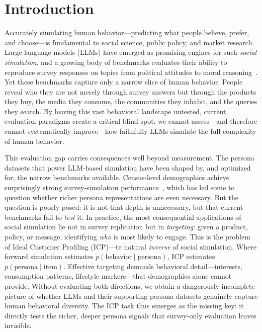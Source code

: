 \section{Introduction}
\label{sec:intro}

Accurately simulating human behavior---predicting what people believe, prefer, and choose---is fundamental to social science, public policy, and market research.
Large language models (LLMs) have emerged as promising engines for such \emph{social simulation}, and a growing body of benchmarks evaluates their ability to reproduce survey responses on topics from political attitudes to moral reasoning~\cite{opinionqa, globalopinionqa, culturebench, culturenli, simbench}.
Yet these benchmarks capture only a narrow slice of human behavior.
People reveal who they are not merely through survey answers but through the products they buy, the media they consume, the communities they inhabit, and the queries they search.
By leaving this vast behavioral landscape untested, current evaluation paradigms create a critical blind spot: we cannot assess---and therefore cannot systematically improve---how faithfully LLMs simulate the full complexity of human behavior.

This evaluation gap carries consequences well beyond measurement.
The persona datasets that power LLM-based simulation have been shaped by, and optimized for, the narrow benchmarks available.
Census-level demographics achieve surprisingly strong survey-simulation performance~\cite{argyle2023out}, which has led some to question whether richer persona representations are even necessary.
But the question is poorly posed: it is not that depth is unnecessary, but that current benchmarks fail to \emph{test} it.
In practice, the most consequential applications of social simulation lie not in survey replication but in \emph{targeting}: given a product, policy, or message, identifying \emph{who} is most likely to engage.
This is the problem of Ideal Customer Profiling (ICP)---te natural \emph{inverse} of social simulation.
Where forward simulation estimates $p(\text{behavior} \mid \text{persona})$, ICP estimates $p(\text{persona} \mid \text{item})$.
Effective targeting demands behavioral detail---interests, consumption patterns, lifestyle markers---that demographics alone cannot provide.
Without evaluating both directions, we obtain a dangerously incomplete picture of whether LLMs and their supporting persona datasets genuinely capture human behavioral diversity.
The ICP task thus emerges as the missing key: it directly tests the richer, deeper persona signals that survey-only evaluation leaves invisible.

